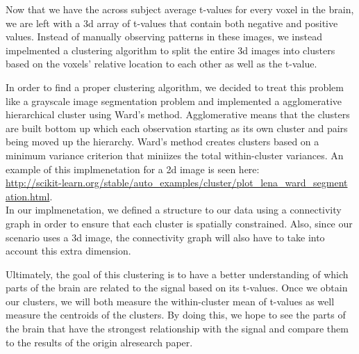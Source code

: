 \par Now that we have the across subject average t-values for every voxel in
the brain, we are left with a 3d array of t-values that contain both negative
and positive values. Instead of manually observing patterns in these images, we
instead impelmented a clustering algorithm to split the entire 3d images into
clusters based on the voxels' relative location to each other as well as the
t-value.

\par In order to find a proper clustering algorithm, we decided to treat this
problem like a grayscale image segmentation problem and implemented a
agglomerative hierarchical cluster using Ward's method. Agglomerative means
that the clusters are built bottom up which each observation starting as its
own cluster and pairs being moved up the hierarchy. Ward's method creates
clusters based on a minimum variance criterion that miniizes the total
within-cluster variances. An example of this implmenetation for a 2d image is
seen here: \\
\url{http://scikit-learn.org/stable/auto_examples/cluster/plot_lena_ward_segment
 ation.html}.\\

In our implmenetation, we defined a structure to our data using a connectivity
graph in order to ensure that each cluster is spatially constrained. Also,
since our scenario uses a 3d image, the connectivity graph will also have to
take into account this extra dimension.

\par Ultimately, the goal of this clustering is to have a better understanding
of which parts of the brain are related to the signal based on its t-values.
Once we obtain our clusters, we will both measure the within-cluster mean of
t-values as well measure the centroids of the clusters. By doing this, we hope
to see the parts of the brain that have the strongest relationship with the
signal and compare them to the results of the origin alresearch paper.



